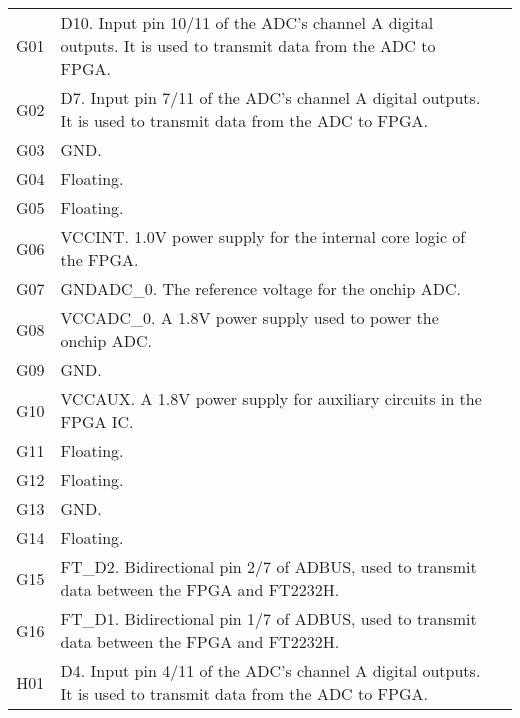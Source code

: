 \begin{tabularx}{\textwidth}{c X>{\raggedright\arraybackslash}X}
        G01 & D10. Input pin 10/11 of the ADC's channel A digital outputs. It is used to transmit data
        from the ADC to FPGA. \\
        G02 & D7. Input pin 7/11 of the ADC's channel A digital outputs. It is used to transmit data from
        the ADC to FPGA. \\
        G03 & GND\@. \\
        G04 & Floating. \\
        G05 & Floating. \\
        G06 & VCCINT. 1.0V power supply for the internal core logic of the FPGA. \\
        G07 & GNDADC\_0. The reference voltage for the onchip ADC. \\
        G08 & VCCADC\_0. A 1.8V power supply used to power the onchip ADC. \\
        G09 & GND\@. \\
        G10 & VCCAUX. A 1.8V power supply for auxiliary circuits in the FPGA IC. \\
        G11 & Floating. \\
        G12 & Floating. \\
        G13 & GND\@. \\
        G14 & Floating. \\
        G15 & FT\_D2. Bidirectional pin 2/7 of ADBUS, used to transmit data between the FPGA and
        FT2232H. \\
        G16 & FT\_D1. Bidirectional pin 1/7 of ADBUS, used to transmit data between the FPGA and
        FT2232H. \\

        \midrule

        H01 & D4. Input pin 4/11 of the ADC's channel A digital outputs. It is used to transmit data from
        the ADC to FPGA. \\


\end{tabularx}
